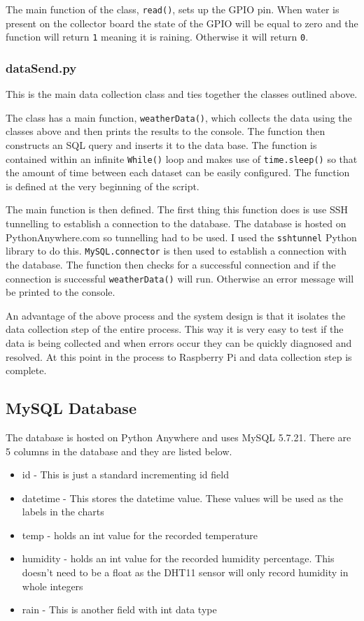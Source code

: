 \documentclass[10pt,a4paper]{article}
\begin{document}
The main function of the class, \texttt{read()}, sets up the GPIO pin. When water is present on the collector board the state of the GPIO will be equal to zero and the function will return \texttt{1} meaning it is raining. Otherwise it will return \texttt{0}. 

\subsubsection{dataSend.py}
This is the main data collection class and ties together the classes outlined above. 

The class has a main function, \texttt{weatherData()}, which collects the data using the classes above and then prints the results to the console. The function then constructs an SQL query and inserts it to the data base. The function is contained within an infinite \texttt{While()} loop and makes use of  \texttt{time.sleep()} so that the amount of time between each dataset can be easily configured. The function is defined at the very beginning of the script. 

The main function is then defined. The first thing this function does is use SSH tunnelling to establish a connection to the database. The database is hosted on PythonAnywhere.com so tunnelling had to be used. I used the \texttt{sshtunnel} Python library to do this. \texttt{MySQL.connector} is then used to establish a connection with the database. The function then checks for a successful connection and if the connection is successful \texttt{weatherData()} will run. Otherwise an error message will be printed to the console. 

An advantage of the above process and the system design is that it isolates the data collection step of the entire process. This way it is very easy to test if the data is being collected and when errors occur they can be quickly diagnosed and resolved. At this point in the process to Raspberry Pi and data collection step is complete. 

\subsection{MySQL Database}
The database is hosted on Python Anywhere and uses MySQL 5.7.21. There are 5 columns in the database and they are listed below. 
\begin{itemize}
\item id - This is just a standard incrementing id field
\item datetime - This stores the datetime value. These values will be used as the labels in the charts
\item temp - holds an int value for the recorded temperature
\item humidity - holds an int value for the recorded humidity percentage. This doesn't need to be a float as the DHT11 sensor will only record humidity in whole integers
\item rain - This is another field with int data type
\end{itemize}
\end{document}
